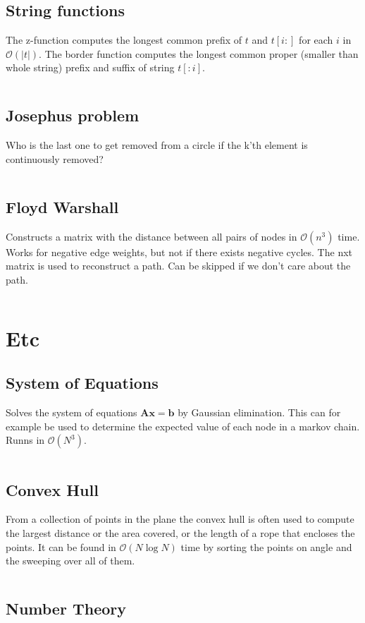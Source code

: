 \documentclass[8pt,a4paper,landscape,oneside]{amsart}
\newcommand{\codep}[1]{\inputminted[fontsize=\large,tabsize=2,baselinestretch=1]{py}{src/#1}}
\newcommand{\bigO}{\mathcal{O}}
\begin{document}
\begin{multicols*}{2}
\begin{large}
    \subsection{String functions}
        The z-function computes the longest common prefix of $t$ and $t[i:]$ for each $i$ in $\bigO(|t|)$.
        The border function computes the longest common proper (smaller than whole string) prefix and suffix of string $t[:i]$.
        \codep{dynamicprogramming/strings.py}
    \subsection{Josephus problem}
        Who is the last one to get removed from a circle if the k'th element is continuously removed?
        \codep{dynamicprogramming/josephus.py}
    \subsection{Floyd Warshall}
        Constructs a matrix with the distance between all pairs of nodes in $\bigO(n^3)$ time.
        Works for negative edge weights, but not if there exists negative cycles.
        The nxt matrix is used to reconstruct a path. Can be skipped if we don't care about the path.
        \codep{dynamicprogramming/floydwarshall.py}

\section{Etc}
    \subsection{System of Equations}
        Solves the system of equations $\bm{A}\bm{x} = \bm{b}$ by Gaussian elimination. This can for example be used to determine the expected value of each node in a markov chain. Runns in $\bigO (N^3)$.
        \codep{misc/gauss.py}
    \subsection{Convex Hull}
        From a collection of points in the plane the convex hull is often used to compute the largest distance or the area covered, or the length of a rope that encloses the points. It can be found in $\bigO (N\log{N})$ time by sorting the points on angle and the sweeping over all of them.
        \codep{misc/convexhull.py}
    \subsection{Number Theory}
        \codep{misc/numbertheory.py}
        \codep{misc/primes.py}

\end{large}
\end{multicols*}
\end{document}
